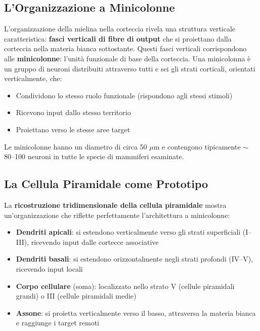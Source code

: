 \subsection{L'Organizzazione a Minicolonne}

L'organizzazione della mielina nella corteccia rivela una struttura verticale caratteristica: \textbf{fasci verticali di fibre di output} che si proiettano dalla corteccia nella materia bianca sottostante. Questi fasci verticali corrispondono alle \textbf{minicolonne}: l'unità funzionale di base della corteccia. Una minicolonna è un gruppo di neuroni distribuiti attraverso tutti e sei gli strati corticali, orientati verticalmente, che:

\begin{itemize}
    \item Condividono lo stesso ruolo funzionale (rispondono agli stessi stimoli)
    \item Ricevono input dallo stesso territorio
    \item Proiettano verso le stesse aree target
\end{itemize}

Le minicolonne hanno un diametro di circa 50 $\mu$m e contengono tipicamente $\sim$80–100 neuroni in tutte le specie di mammiferi esaminate.

\subsection{La Cellula Piramidale come Prototipo}

La \textbf{ricostruzione tridimensionale della cellula piramidale} mostra un'organizzazione che riflette perfettamente l'architettura a minicolonne:

\begin{itemize}
    \item \textbf{Dendriti apicali}: si estendono verticalmente verso gli strati superficiali (I–III), ricevendo input dalle cortecce associative
    \item \textbf{Dendriti basali}: si estendono orizzontalmente negli strati profondi (IV–V), ricevendo input locali
    \item \textbf{Corpo cellulare} (soma): localizzato nello strato V (cellule piramidali grandi) o III (cellule piramidali medie)
    \item \textbf{Assone}: si proietta verticalmente verso il basso, attraversa la materia bianca e raggiunge i target remoti
\end{itemize}

